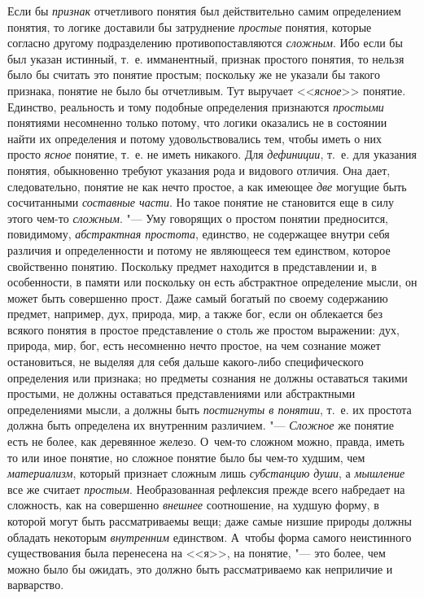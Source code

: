 Если бы {\em признак}
отчетливого понятия был действительно самим определением
понятия, то логике доставили бы затруднение
{\em простые} понятия,
которые согласно другому подразделению противопоставляются
{\em сложным}. Ибо если
бы был указан истинный, т.~е. имманентный, признак простого понятия, то
нельзя было бы считать это понятие простым; поскольку же не указали бы
такого признака, понятие не было бы отчетливым. Тут выручает
<<{\em ясное}>> понятие.
Единство, реальность и тому подобные определения признаются
{\em простыми} понятиями
несомненно только потому, что логики оказались не в состоянии найти их
определения и потому удовольствовались тем, чтобы иметь о них просто
{\em ясное} понятие,
т.~е. не иметь никакого. Для
{\em дефиниции}, т.~е.
для указания понятия, обыкновенно требуют указания рода и видового отличия.
Она дает, следовательно, понятие не как нечто простое, а как имеющее
{\em две} могущие быть
сосчитанными {\em составные части}.
Но такое понятие не становится еще в силу этого чем-то
{\em сложным}. "--- Уму
говорящих о простом понятии предносится, повидимому,
{\em абстрактная простота},
единство, не содержащее внутри себя различия и определенности
и потому не являющееся тем единством, которое свойственно понятию.
Поскольку предмет находится в представлении и, в особенности, в памяти или
поскольку он есть абстрактное определение мысли, он может быть совершенно
прост. Даже самый богатый по своему содержанию предмет, например, дух,
природа, мир, а также бог, если он облекается без всякого понятия в простое
представление о столь же простом выражении: дух, природа, мир, бог, есть
несомненно нечто простое, на чем сознание может остановиться, не выделяя
для себя дальше какого-либо специфического определения или признака; но
предметы сознания не должны оставаться такими простыми, не должны
оставаться представлениями или абстрактными определениями мысли, а должны
быть {\em постигнуты в понятии},
т.~е. их простота должна быть определена их внутренним
различием. "--- {\em Сложное}
же понятие есть не более, как деревянное железо. О~чем-то
сложном можно, правда, иметь то или иное понятие, но сложное понятие было
бы чем-то худшим, чем
{\em материализм},
который признает сложным лишь
{\em субстанцию души}, а
{\em мышление} все же
считает {\em простым}.
Необразованная рефлексия прежде всего набредает на сложность,
как на совершенно {\em внешнее}
соотношение, на худшую форму, в которой могут быть
рассматриваемы вещи; даже самые низшие природы должны обладать некоторым
{\em внутренним}
единством. А~чтобы форма самого неистинного существования
была перенесена на <<я>>, на понятие, "--- это более, чем можно
было бы ожидать, это должно быть рассматриваемо как
неприличие и варварство.

